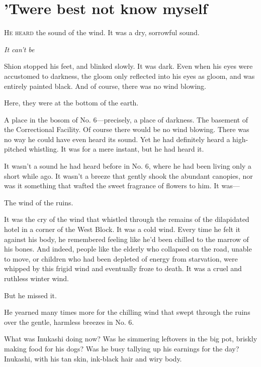 
\chapter{'Twere best not know myself}


\lettrine{H}{e heard} the sound of the wind. It was a dry, sorrowful sound.

\emph{It can't be\el }

Shion stopped his feet, and blinked slowly. It was dark. Even when his
eyes were accustomed to darkness, the gloom only reflected into his eyes
as gloom, and was entirely painted black. And of course, there was no
wind blowing.

Here, they were at the bottom of the earth.

A place in the bosom of No. 6---precisely, a place of darkness. The
basement of the Correctional Facility. Of course there would be no wind
blowing. There was no way he could have even heard its sound. Yet he had
definitely heard a high-pitched whistling. It was for a mere instant,
but he had heard it.

It wasn't a sound he had heard before in No. 6, where he had been living
only a short while ago. It wasn't a breeze that gently shook the
abundant canopies, nor was it something that wafted the sweet fragrance
of flowers to him. It was---

The wind of the ruins.

It was the cry of the wind that whistled through the remains of the
dilapidated hotel in a corner of the West Block. It was a cold wind.
Every time he felt it against his body, he remembered feeling like he'd
been chilled to the marrow of his bones. And indeed, people like the
elderly who collapsed on the road, unable to move, or children who had
been depleted of energy from starvation, were whipped by this frigid
wind and eventually froze to death. It was a cruel and ruthless winter
wind.

But he missed it.

He yearned many times more for the chilling wind that swept through the
ruins over the gentle, harmless breezes in No. 6.

What was Inukashi doing now? Was he simmering leftovers in the big pot,
briskly making food for his dogs? Was he busy tallying up his earnings
for the day? Inukashi, with his tan skin, ink-black hair and wiry body.

